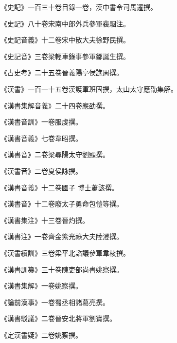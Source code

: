 
\begin{pinyinscope}

 《史記》一百三十卷目錄一卷，漢中書令司馬遷撰。



 《史記》八十卷宋南中郎外兵參軍裴駰注。



 《史記音義》十二卷宋中散大夫徐野民撰。



 《史記音》三卷梁輕車錄事參軍鄒誕生撰。



 《古史考》二十五卷晉義陽亭侯譙周撰。



 《漢書》一百一十五卷漢護軍班固撰，太山太守應劭集解。



 《漢書集解音義》二十四卷應劭撰。



 《漢書音訓》一卷服虔撰。



 《漢書音義》七卷韋昭撰。



 《漢書音》二卷梁尋陽太守劉顯撰。



 《漢書音》二卷夏侯詠撰。



 《漢書音義》十二卷國子
 博士蕭該撰。



 《漢書音》十二卷廢太子勇命包愷等撰。



 《漢書集注》十三卷晉灼撰。



 《漢書注》一卷齊金紫光祿大夫陸澄撰。



 《漢書續訓》三卷梁平北諮議參軍韋棱撰。



 《漢書訓纂》三十卷陳吏部尚書姚察撰。



 《漢書集解》一卷姚察撰。



 《論前漢事》一卷蜀丞相諸葛亮撰。



 《漢書駁議》二卷晉安北將軍劉寶撰。



 《定漢書疑》二卷姚察撰。




\end{pinyinscope}
